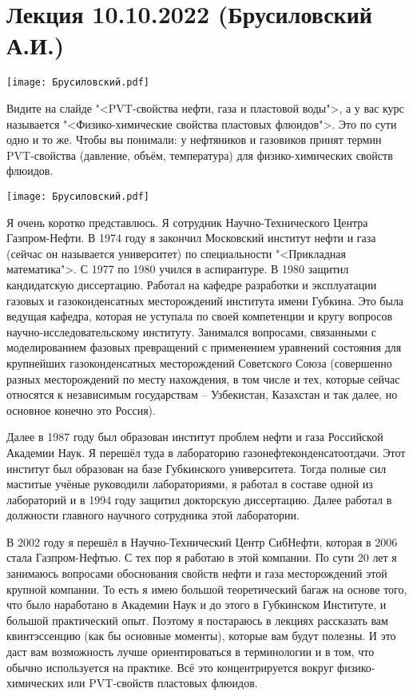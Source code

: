 \documentclass[main.tex]{subfiles}
\begin{document}
\section{Лекция 10.10.2022 (Брусиловский А.И.)}

\begin{center}
\texttt{[image: Брусиловский.pdf]}
\end{center}

Видите на слайде "<PVT-свойства нефти, газа и пластовой воды">, а у вас курс называется "<Физико-химические свойства пластовых флюидов">.
Это по сути одно и то же.
Чтобы вы понимали: у нефтяников и газовиков принят термин PVT-свойства (давление, объём, температура) для физико-химических свойств флюидов.

\begin{center}
\texttt{[image: Брусиловский.pdf]}
\end{center}

Я очень коротко представлюсь.
Я сотрудник Научно-Технического Центра Газпром-Нефти.
В 1974 году я закончил Московский институт нефти и газа (сейчас он называется университет) по специальности "<Прикладная математика">.
С 1977 по 1980 учился в аспирантуре.
В 1980 защитил кандидатскую диссертацию.
Работал на кафедре разработки и эксплуатации газовых и газоконденсатных месторождений института имени Губкина.
Это была ведущая кафедра, которая не уступала по своей компетенции и кругу вопросов научно-исследовательскому институту.
Занимался вопросами, связанными с моделированием фазовых превращений с применением уравнений состояния для крупнейших газоконденсатных месторождений Советского Союза (совершенно разных месторождений по месту нахождения, в том числе и тех, которые сейчас относятся к независимым государствам -- Узбекистан, Казахстан и так далее, но основное конечно это Россия).

Далее в 1987 году был образован институт проблем нефти и газа Российской Академии Наук.
Я перешёл туда в лабораторию газонефтеконденсатоотдачи.
Этот институт был образован на базе Губкинского университета.
Тогда полные сил маститые учёные руководили лабораториями, я работал в составе одной из лабораторий и в 1994 году защитил докторскую диссертацию.
Далее работал в должности главного научного сотрудника этой лаборатории.

В 2002 году я перешёл в Научно-Технический Центр СибНефти, которая в 2006 стала Газпром-Нефтью.
С тех пор я работаю в этой компании.
По сути 20 лет я занимаюсь вопросами обоснования свойств нефти и газа месторождений этой крупной компании.
То есть я имею большой теоретический багаж на основе того, что было наработано в Академии Наук и до этого в Губкинском Институте, и большой практический опыт.
Поэтому я постараюсь в лекциях рассказать вам квинтэссенцию (как бы основные моменты), которые вам будут полезны.
И это даст вам возможность лучше ориентироваться в терминологии и в том, что обычно используется на практике.
Всё это концентрируется вокруг физико-химических или PVT-свойств пластовых флюидов.
\end{document}
